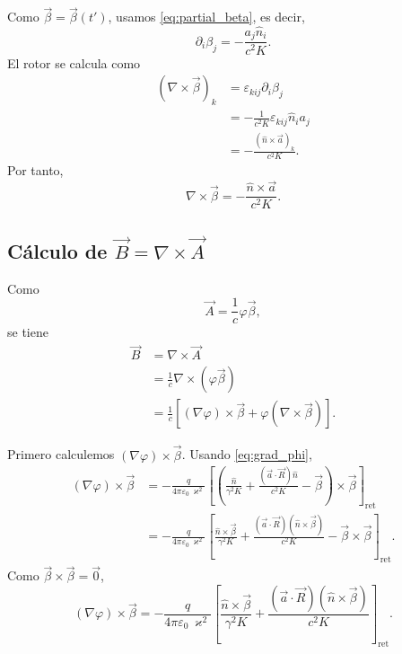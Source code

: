 \documentclass{article}
\numberwithin{equation}{section}
\newcommand{\eps}{\varepsilon_0}
\newcommand{\bv}{\vec{\beta}}
\newcommand{\av}{\vec{a}}
\newcommand{\Rv}{\vec{R}}
\newcommand{\nh}{\hat{n}}
\newcommand{\K}{K}
\begin{document}
Como $\bv=\bv(t')$, usamos \eqref{eq:partial_beta}, es decir,
\begin{equation*}
  \partial_i\beta_j
  =-\frac{a_j\hat{n}_i}{c^2\K}.
\end{equation*}
El rotor se calcula como
\begin{align*}
  (\nabla\times\bv)_k
  &=\varepsilon_{kij}\partial_i\beta_j \\
  &=-\frac{1}{c^2\K}\varepsilon_{kij}\hat{n}_i a_j \\
  &=-\frac{(\nh\times\av)_k}{c^2\K}.
\end{align*}
Por tanto,
\begin{equation}
  \boxed{
  \nabla\times\bv
  =-\frac{\nh\times\av}{c^2\K}.
  }
  \label{eq:rot_beta}
\end{equation}

\subsection{C\'alculo de $\vec{B}=\nabla\times\vec{A}$}

Como
\begin{equation*}
  \vec{A}=\frac{1}{c}\varphi\bv,
\end{equation*}
se tiene
\begin{equation}
\begin{aligned}  \vec{B}
  &=\nabla\times\vec{A} \\
  &=\frac{1}{c}\nabla\times(\varphi\bv) \\
  &=\frac{1}{c}\left[(\nabla\varphi)\times\bv
  +\varphi(\nabla\times\bv)\right].
\end{aligned}
  \label{eq:B_start}
\end{equation}

Primero calculemos $(\nabla\varphi)\times\bv$. Usando \eqref{eq:grad_phi},
\begin{align*}
  (\nabla\varphi)\times\bv
  &=-\frac{q}{4\pi\eps\,\varkappa^2}
  \left[
  \left(
  \frac{\nh}{\gamma^2\K}
  +\frac{(\av\cdot\Rv)\nh}{c^2\K}
  -\bv
  \right)\times\bv
  \right]_{\mathrm{ret}} \\
  &=-\frac{q}{4\pi\eps\,\varkappa^2}
  \left[
  \frac{\nh\times\bv}{\gamma^2\K}
  +\frac{(\av\cdot\Rv)(\nh\times\bv)}{c^2\K}
  -\bv\times\bv
  \right]_{\mathrm{ret}}.
\end{align*}
Como $\bv\times\bv=\vec{0}$,
\begin{equation}
  (\nabla\varphi)\times\bv
  =-\frac{q}{4\pi\eps\,\varkappa^2}
  \left[
  \frac{\nh\times\bv}{\gamma^2\K}
  +\frac{(\av\cdot\Rv)(\nh\times\bv)}{c^2\K}
  \right]_{\mathrm{ret}}.
  \label{eq:grad_phi_cross_beta}
\end{equation}
\end{document}
